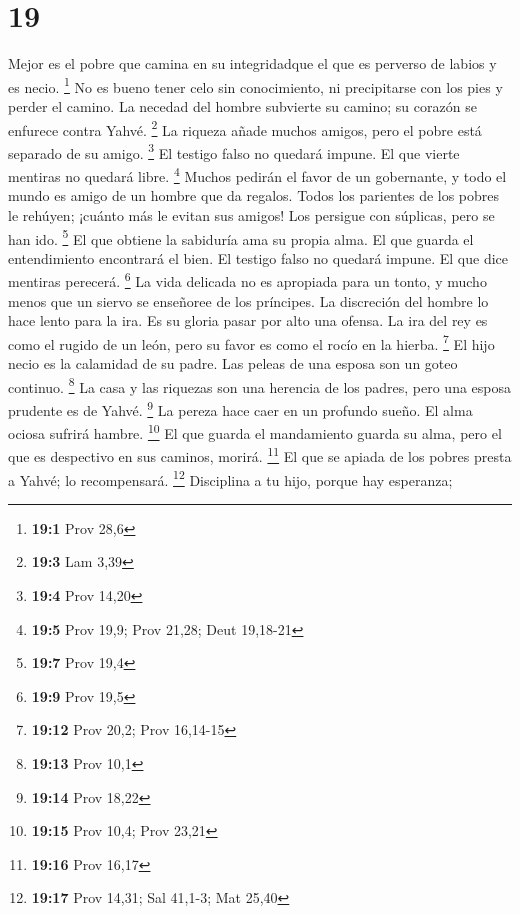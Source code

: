 \hypertarget{section-18}{%
\section{19}\label{section-18}}

 Mejor es el pobre que camina en su integridadque el que
es perverso de labios y es necio. \footnote{\textbf{19:1} Prov 28,6}
 No es bueno tener celo sin conocimiento, ni precipitarse
con los pies y perder el camino.  La necedad del hombre
subvierte su camino; su corazón se enfurece contra Yahvé. \footnote{\textbf{19:3}
  Lam 3,39}  La riqueza añade muchos amigos, pero el pobre
está separado de su amigo. \footnote{\textbf{19:4} Prov 14,20}
 El testigo falso no quedará impune. El que vierte
mentiras no quedará libre. \footnote{\textbf{19:5} Prov 19,9; Prov
  21,28; Deut 19,18-21}  Muchos pedirán el favor de un
gobernante, y todo el mundo es amigo de un hombre que da regalos.
 Todos los parientes de los pobres le rehúyen; ¡cuánto más
le evitan sus amigos! Los persigue con súplicas, pero se han ido.
\footnote{\textbf{19:7} Prov 19,4}  El que obtiene la
sabiduría ama su propia alma. El que guarda el entendimiento encontrará
el bien.  El testigo falso no quedará impune. El que dice
mentiras perecerá. \footnote{\textbf{19:9} Prov 19,5}  La
vida delicada no es apropiada para un tonto, y mucho menos que un siervo
se enseñoree de los príncipes.  La discreción del hombre
lo hace lento para la ira. Es su gloria pasar por alto una ofensa.
 La ira del rey es como el rugido de un león, pero su
favor es como el rocío en la hierba. \footnote{\textbf{19:12} Prov 20,2;
  Prov 16,14-15}  El hijo necio es la calamidad de su
padre. Las peleas de una esposa son un goteo continuo. \footnote{\textbf{19:13}
  Prov 10,1}  La casa y las riquezas son una herencia de
los padres, pero una esposa prudente es de Yahvé. \footnote{\textbf{19:14}
  Prov 18,22}  La pereza hace caer en un profundo sueño.
El alma ociosa sufrirá hambre. \footnote{\textbf{19:15} Prov 10,4; Prov
  23,21}  El que guarda el mandamiento guarda su alma,
pero el que es despectivo en sus caminos, morirá. \footnote{\textbf{19:16}
  Prov 16,17}  El que se apiada de los pobres presta a
Yahvé; lo recompensará. \footnote{\textbf{19:17} Prov 14,31; Sal 41,1-3;
  Mat 25,40}  Disciplina a tu hijo, porque hay esperanza;
